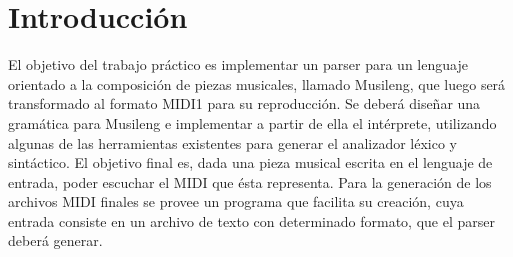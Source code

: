 \section{Introducción}
El objetivo del trabajo práctico es implementar un parser para un lenguaje orientado a la composición de
piezas musicales, llamado Musileng, que luego será transformado al formato MIDI1 para su reproducción.
Se deberá diseñar una gramática para Musileng e implementar a partir de ella el intérprete, utilizando
algunas de las herramientas existentes para generar el analizador léxico y sintáctico. El objetivo final es,
dada una pieza musical escrita en el lenguaje de entrada, poder escuchar el MIDI que ésta representa.
Para la generación de los archivos MIDI finales se provee un programa que facilita su creación, cuya
entrada consiste en un archivo de texto con determinado formato, que el parser deberá generar.
